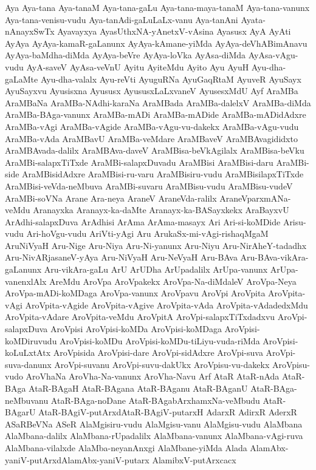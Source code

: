 {Aya
Aya-tana
Aya-tanaM
Aya-tana-gaLu
Aya-tana-maya-tanaM
Aya-tana-vanunx
Aya-tana-venisu-vudu
Aya-tanAdi-gaLuLaLx-vanu
Aya-tanAni
Ayata-nAnayxSwTx
Ayavayxya
AyasUthxNA-yAnetxV-vAsina
Ayasusx
AyA
AyAti
AyAya
AyAya-kamaR-gaLanunx
AyAya-kAmane-yiMda
AyAya-deVhABimAnavu
AyAya-baMdha-diMda
AyAya-beVre
AyAya-loVka
AyAsa-diMda
AyAsa-vAgu-vudu
AyA-saveV
AyAsa-veVnU
Ayitu
AyiteMdu
Ayito
Ayu
AyuH
Ayu-dha-gaLaMte
Ayu-dha-valalx
Ayu-reVti
AyuguRNa
AyuGaqRtaM
AyuveR
AyuSayx
AyuSayxvu
Ayusisxna
Ayususx
AyususxLaLxvaneV
AyusesxMdU
Ayf
AraMBa
AraMBaNa
AraMBa-NAdhi-karaNa
AraMBada
AraMBa-dalelxV
AraMBa-diMda
AraMBa-BAga-vanunx
AraMBa-mADi
AraMBa-mADide
AraMBa-mADidAdxre
AraMBa-vAgi
AraMBa-vAgide
AraMBa-vAgu-vu-dakekx
AraMBa-vAgu-vudu
AraMBa-vAda
AraMBavU
AraMBa-veMdare
AraMBaveV
AraMBAvagididxto
AraMBAvada-dalilx
AraMBAva-daveV
AraMBisa-beVkAgilalx
AraMBisa-beVku
AraMBi-salapxTiTxde
AraMBi-salapxDuvadu
AraMBisi
AraMBisi-daru
AraMBi-side
AraMBisidAdxre
AraMBisi-ru-varu
AraMBisiru-vudu
AraMBisilapxTiTxde
AraMBisi-veVda-neMbuva
AraMBi-suvaru
AraMBisu-vudu
AraMBisu-vudeV
AraMBi-soVNa
Arane
Ara-neya
AraneV
AraneVda-ralilx
AraneVparxmANa-veMdu
Aranayxka
Aranayx-ka-daMte
Aranayx-ka-BASayxkekx
AraBayxvU
ArAdhi-salapxDuva
ArAdhisi
ArAma
ArAma-masayx
Ari
Ari-si-koMDide
Arisu-vudu
Ari-hoVgu-vudu
AriVti-yAgi
Aru
ArukaSx-mi-vAgi-rishaqMgaM
AruNiVyaH
Aru-Nige
Aru-Niya
Aru-Ni-yanunx
Aru-Niyu
Aru-NirAheY-tadadhx
Aru-NivARjasaneV-yAya
Aru-NiVyaH
Aru-NeVyaH
Aru-BAva
Aru-BAva-vikAra-gaLanunx
Aru-vikAra-gaLu
ArU
ArUDha
ArUpadalilx
ArUpa-vanunx
ArUpa-vanenxlAlx
AreMdu
AroVpa
AroVpakekx
AroVpa-Na-diMdaleV
AroVpa-Neya
AroVpa-mADi-koMDaga
AroVpa-vanunx
AroVpavu
AroVpi
AroVpita
AroVpita-vAgi
AroVpita-vAgide
AroVpita-vAgive
AroVpita-vAda
AroVpita-vAdadedxMdu
AroVpita-vAdare
AroVpita-veMdu
AroVpitA
AroVpi-salapxTiTxdadxvu
AroVpi-salapxDuva
AroVpisi
AroVpisi-koMDa
AroVpisi-koMDaga
AroVpisi-koMDiruvudu
AroVpisi-koMDu
AroVpisi-koMDu-tiLiyu-vuda-riMda
AroVpisi-koLuLxtAtx
AroVpisida
AroVpisi-dare
AroVpi-sidAdxre
AroVpi-suva
AroVpi-suva-danunx
AroVpi-suvanu
AroVpi-suvu-dakUkx
AroVpisu-vu-dakekx
AroVpisu-vudo
AroVhaNa
AroVha-Na-vanunx
AroVha-Navu
Arf
AtaR
AtaR-nAda
AtaR-BAga
AtaR-BAgaH
AtaR-BAgana
AtaR-BAganu
AtaR-BAganU
AtaR-BAga-neMbuvanu
AtaR-BAga-noDane
AtaR-BAgabArxhamxNa-veMbudu
AtaR-BAgarU
AtaR-BAgiV-putArxdAtaR-BAgiV-putarxH
AdarxR
AdirxR
AderxR
ASaRBeVNa
ASeR
AlaMgisiru-vudu
AlaMgisu-vanu
AlaMgisu-vudu
AlaMbana
AlaMbana-dalilx
AlaMbana-rUpadalilx
AlaMbana-vanunx
AlaMbana-vAgi-ruva
AlaMbana-vilalxde
AlaMba-neyanAnxgi
AlaMbane-yiMda
Alada
AlamAbx-yaniV-putArxdAlamAbx-yaniV-putarx
AlamibxV-putArxcacx
}
